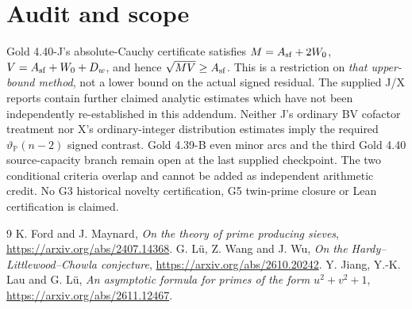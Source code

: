 \documentclass[11pt]{article}
\begin{document}
\section{Audit and scope}
Gold 4.40-J's absolute-Cauchy certificate satisfies
\(M=A_{\rm sf}+2W_0\), \(V=A_{\rm sf}+W_0+D_w\), and hence
\(\sqrt{MV}\ge A_{\rm sf}\). This is a restriction on \emph{that
upper-bound method}, not a lower bound on the actual signed residual.
The supplied J/X reports contain further claimed analytic estimates
which have not been independently re-established in this addendum.
Neither J's ordinary BV cofactor treatment nor X's ordinary-integer
distribution estimates imply the required \(\vartheta_{\mathbb P}(n-2)\)
signed contrast. Gold 4.39-B even minor arcs and the third Gold 4.40
source-capacity branch remain open at the last supplied checkpoint.
The two conditional criteria overlap and cannot be added as
independent arithmetic credit. No G3 historical novelty certification,
G5 twin-prime closure or Lean certification is claimed.
\begin{thebibliography}{9}
 K. Ford and J. Maynard, \emph{On the theory of prime producing sieves},
\url{https://arxiv.org/abs/2407.14368}.
 G. L\"u, Z. Wang and J. Wu,
\emph{On the Hardy--Littlewood--Chowla conjecture},
\url{https://arxiv.org/abs/2610.20242}.
 Y. Jiang, Y.-K. Lau and G. L\"u,
\emph{An asymptotic formula for primes of the form \(u^2+v^2+1\)},
\url{https://arxiv.org/abs/2611.12467}.
\end{thebibliography}
\end{document}
